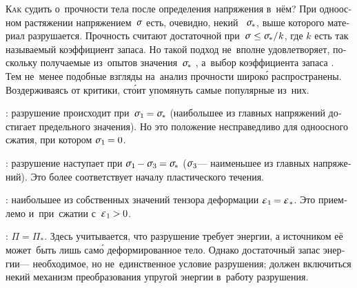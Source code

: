 \begin{otherlanguage}{russian}

\lettrine[lines=2, findent=2pt, nindent=0pt]{К}{ак} судить о~прочности тела после определения напряжения в~нём? При одноосном растяжении напряжением~$\mathsigma$ есть, очевидно, некий ~${\tensilestrength}$, выше которого материал разрушается. Прочность считают достаточной при~${\mathsigma \hspace{.1ex} \leq \tensilestrength / \hspace{.1ex} k}$, где $k$ есть так называемый коэффициент запаса. Но такой подход не~вполне удовлетворяет, поскольку получаемые из~опытов значения~${\tensilestrength}$ , а~выбор коэффициента запаса . Тем не~менее подобные взгляды на~анализ прочности широк\'{о} распространены. Воздерживаясь от критики, ст\'{о}ит упомянуть самые популярные из~них.

:
разрушение происходит при~${\mathsigma_1 \hspace{-0.15ex} = \tensilestrength}$ (наибольшее из главных напряжений достигает предельного значения).
Но это положение несправедливо для одноосного сжатия, при котором ${\mathsigma_1 \hspace{-0.15ex} = 0}$.

:
разрушение наступает при ${\mathsigma_1 \hspace{-0.15ex} - \mathsigma_3 \hspace{-0.1ex} = \tensilestrength}$ ($\mathsigma_3$\:--- наименьшее из главных напряжений).
Это более соответствует началу пластического течения.

: наибольшее из собственных значений тензора деформации ${\mathepsilon_1 \hspace{-0.2ex} = \mathepsilon_*}$. Это приемлемо и~при~сжатии с~${\mathepsilon_1 \hspace{-0.12ex} > 0}$.

:
${\Pi = \Pi_*}$.
Здесь учитывается, что разрушение требует энергии, а источником её может~быть лишь сам\'{о} деформированное тело.
Однако достаточный запас энергии\:--- необходимое, но не~единственное условие разрушения; должен включиться некий механизм преобразования упругой энергии в~работу разрушения.


\end{otherlanguage}
